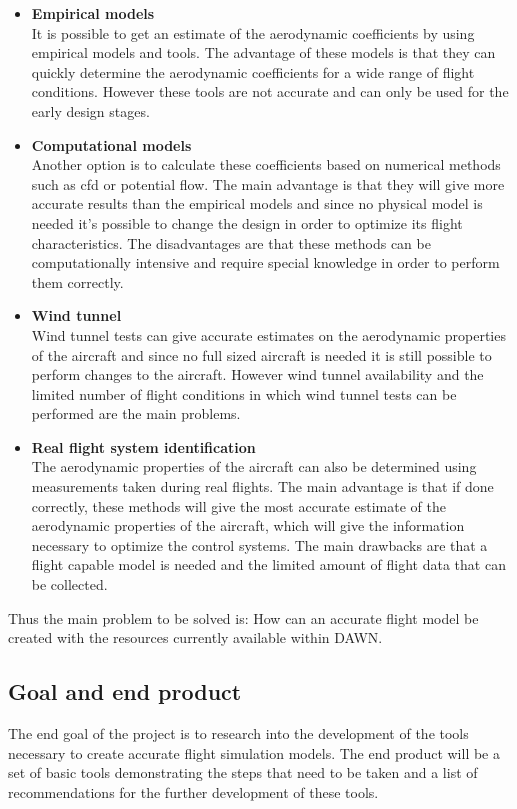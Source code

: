 \begin{itemize}
\item \textbf{Empirical models} \\ It is possible to get an estimate of the aerodynamic coefficients by using empirical models and tools. The advantage of these models is that they can quickly determine the aerodynamic coefficients for a wide range of flight conditions. However these tools are not accurate and can only be used for the early design stages.

\item \textbf{Computational models} \\ Another option is to calculate these coefficients based on numerical methods such as \gls{cfd} or potential flow. The main advantage is that they will give more accurate results than the empirical models and since no physical model is needed it's possible to change the design in order to optimize its flight characteristics. The disadvantages are that these methods can be computationally intensive and require special knowledge in order to perform them correctly.

\item \textbf{Wind tunnel} \\
Wind tunnel tests can give accurate estimates on the aerodynamic properties of the aircraft and since no full sized aircraft is needed it is still possible to perform changes to the aircraft. However wind tunnel availability and the limited number of flight conditions in which wind tunnel tests can be performed are the main problems.

\item \textbf{Real flight system identification} \\
The aerodynamic properties of the aircraft can also be determined using measurements taken during real flights. The main advantage is that if done correctly, these methods will give the most accurate estimate of the aerodynamic properties of the aircraft, which will give the information necessary to optimize the control systems. The main drawbacks are that a flight capable model is needed and the limited amount of flight data that can be collected.
\end{itemize}

Thus the main problem to be solved is: How can an accurate flight model be created with the resources currently available within DAWN.

\subsection{Goal and end product}
The end goal of the project is to research into the development of the tools necessary to create accurate flight simulation models. The end product will be a set of basic tools demonstrating the steps that need to be taken and a list of recommendations for the further development of these tools.


